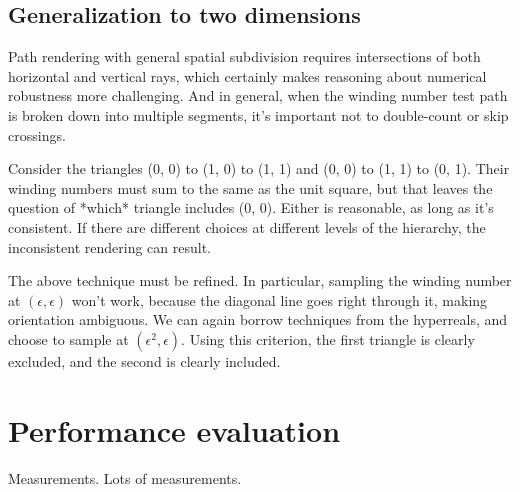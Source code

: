 \documentclass[format=acmsmall]{acmart}
\begin{document}
\subsection{Generalization to two dimensions}

Path rendering with general spatial subdivision requires intersections of both horizontal and vertical rays, which certainly makes reasoning about numerical robustness more challenging. And in general, when the winding number test path is broken down into multiple segments, it's important not to double-count or skip crossings.

Consider the triangles (0, 0) to (1, 0) to (1, 1) and (0, 0) to (1, 1) to (0, 1). Their winding numbers must sum to the same as the unit square, but that leaves the question of *which* triangle includes (0, 0). Either is reasonable, as long as it's consistent. If there are different choices at different levels of the hierarchy, the inconsistent rendering can result.

The above technique must be refined. In particular, sampling the winding number at $(\epsilon, \epsilon)$ won't work, because the diagonal line goes right through it, making orientation ambiguous. We can again borrow techniques from the hyperreals, and choose to sample at $(\epsilon^2, \epsilon)$. Using this criterion, the first triangle is clearly excluded, and the second is clearly included.

\section{Performance evaluation}

Measurements. Lots of measurements.
\end{document}
